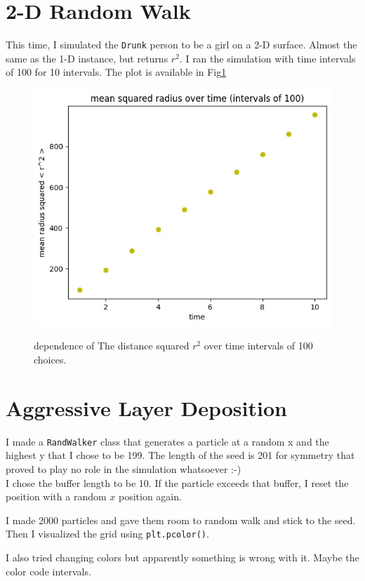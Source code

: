 \documentclass[12pt]{article}
\begin{document}
	\section{2-D Random Walk}
	This time, I simulated the \texttt{Drunk} person to be a girl on a 2-D surface. Almost the same as the 1-D instance, but returns $r^2$. I ran the simulation with time intervals of 100 for 10 intervals. The plot is available in Fig\ref{fig:2d_rw}
	\begin{figure}[h!]
		\includegraphics[width=0.9\linewidth]{../p5/2d_girl.jpg}
		\label{fig:2d_rw}
		\caption{dependence of The distance squared $r^2$ over time intervals of 100 choices.}
	\end{figure}
	
	\section{Aggressive Layer Deposition}
	I made a \texttt{RandWalker} class that generates a particle at a random x and the highest y
	that I chose to be 199. The length of the seed is 201 for symmetry that proved to play no role
	in the simulation whatsoever :-) \\
	I chose the buffer length to be 10. If the particle exceeds that buffer, I reset the position with
	a random $x$ position again.
	
	I made 2000 particles and gave them room to random walk and stick to the seed. Then I 
	visualized the grid using \texttt{plt.pcolor()}.
	
	I also tried changing colors but apparently something is wrong with it. Maybe the color code intervals.
	
\end{document}
